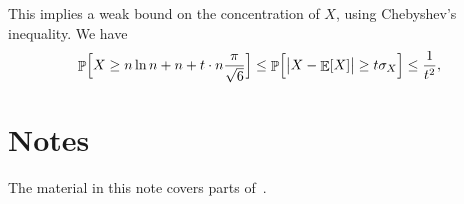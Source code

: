 This implies a weak bound on the concentration of $X$, using Chebyshev's
inequality. We have
\begin{align*}
  \Prob{ X \geq n \ln n + n + t \cdot n \smash{\frac{\pi}{\sqrt{6}}}\Bigr. }%
  \leq%
  \Prob{ \Bigl. \cardin{ \bigl. X - \Ex{X}} \geq t \sigma_X } \leq
  \frac{1}{t^2},
\end{align*}


\section{Notes}

The material in this note covers parts of~\cite[sections
3.1, 3.2, 3.6]{mr-ra-95}.

\ChapterEnd{}


% 
